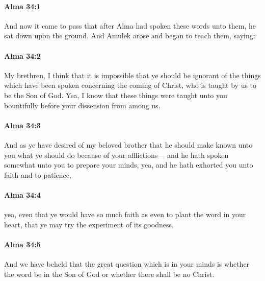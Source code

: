 		\paragraph{Alma 34:1} %
			\label{ALMA-34-1}

			And now it came to pass that
			after Alma had spoken these words unto them,
			he sat down upon the ground.
			And Amulek arose and began to teach them, saying:

		\paragraph{Alma 34:2} %
			\label{ALMA-34-2}

			My brethren, I think that it is impossible
			that ye should be ignorant of the things
			which have been spoken concerning the coming of Christ,
			who is taught by us to be the Son of God.
			Yea, I know that these things were taught unto you bountifully
			before your dissension from among us.

		\paragraph{Alma 34:3} %
			\label{ALMA-34-3}

			And as ye have desired of my beloved brother
			that he should make known unto you
			what ye should do because of your afflictions---
			and he hath spoken somewhat unto you to prepare your minds,
			yea, and he hath exhorted you unto faith and to patience,

		\paragraph{Alma 34:4} %
			\label{ALMA-34-4}

			yea, even that ye would have so much faith
			as even to plant the word in your heart,
			that ye may try the experiment of its goodness.

		\paragraph{Alma 34:5} %
			\label{ALMA-34-5}

			And we have beheld that the great question which is in your minds
			is whether the word be in the Son of God or whether there shall be no Christ.

